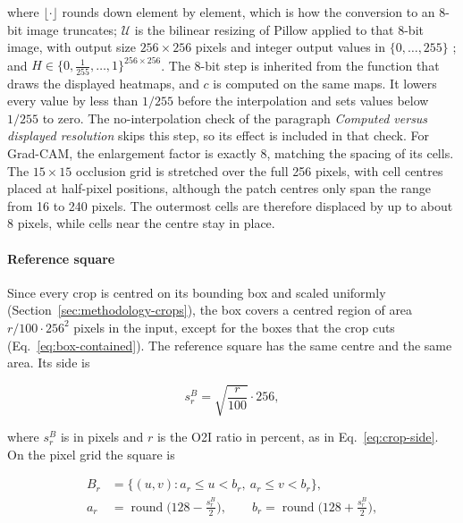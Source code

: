 where $\lfloor \cdot \rfloor$ rounds down element by element, which is how the
conversion to an 8-bit image truncates; $\mathcal{U}$ is the bilinear resizing of
Pillow applied to that 8-bit image, with output size $256 \times 256$ pixels and
integer output values in $\{0, \dots, 255\}$ \citep{pillow2025docs}; and
$H \in \{0, \tfrac{1}{255}, \dots, 1\}^{256 \times 256}$. The 8-bit step is inherited
from the function that draws the displayed heatmaps, and $c$ is computed on the same
maps. It lowers every value by less than $1/255$ before the interpolation and sets
values below $1/255$ to zero. The no-interpolation check of the paragraph
\emph{Computed versus displayed resolution} skips this step, so its effect is included
in that check. For Grad-CAM, the enlargement factor is exactly 8, matching the spacing
of its cells. The $15 \times 15$ occlusion grid is stretched over the full 256 pixels,
with cell centres placed at half-pixel positions, although the patch centres only span
the range from 16 to 240 pixels. The outermost cells are therefore displaced by up to
about 8 pixels, while cells near the centre stay in place.

\paragraph{Reference square}
Since every crop is centred on its bounding box and scaled uniformly
(Section~\ref{sec:methodology-crops}), the box covers a centred region of area
$r/100 \cdot 256^2$ pixels in the input, except for the boxes that the crop cuts
(Eq.~\eqref{eq:box-contained}). The reference square has the same centre and
the same area. Its side is

\begin{equation}
s^{B}_{r} = \sqrt{\frac{r}{100}} \cdot 256,
\label{eq:box-side}
\end{equation}

where $s^{B}_{r}$ is in pixels and $r$ is the O2I ratio in percent, as in
Eq.~\eqref{eq:crop-side}. On the pixel grid the square is

\begin{equation}
\begin{aligned}
B_r &= \{(u, v) : a_r \le u < b_r,\ a_r \le v < b_r\},\\
a_r &= \operatorname{round}\!\big(128 - \tfrac{s^{B}_{r}}{2}\big), \qquad
b_r = \operatorname{round}\!\big(128 + \tfrac{s^{B}_{r}}{2}\big),
\end{aligned}
\label{eq:box-bounds}
\end{equation}

